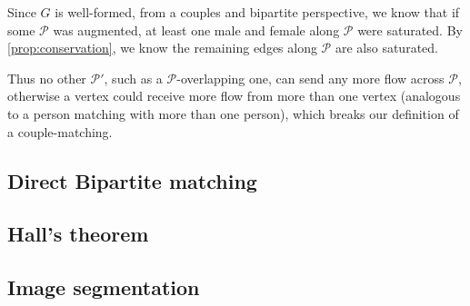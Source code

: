 \documentclass{article}
\theoremstyle{definition}
\begin{document}
Since $G$ is well-formed, from a couples and bipartite perspective, we know that if some $\mathcal{P}$ was augmented, at least one male and female along $\mathcal{P}$ were saturated. By \ref{prop:conservation}, we know the remaining edges along $\mathcal{P}$ are also saturated. 

Thus no other $\mathcal{P'}$, such as a $\mathcal{P}$-overlapping one, can send any more flow across $\mathcal{P}$, otherwise a vertex could receive more flow from more than one vertex (analogous to a person matching with more than one person), which breaks our definition of a couple-matching.

\subsection{Direct Bipartite matching}

\subsection{Hall's theorem}

\subsection{Image segmentation}
\end{document}

